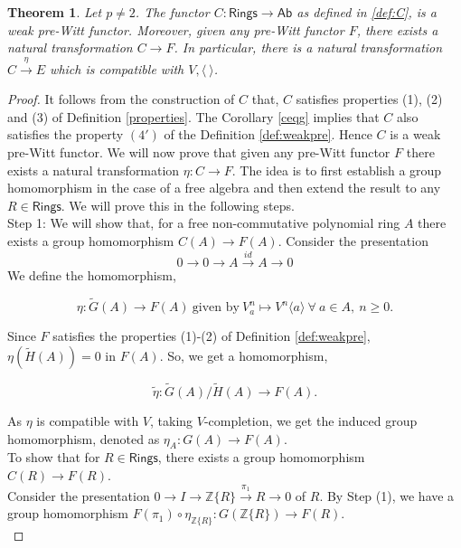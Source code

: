 \documentclass[10pt,a4paper]{amsart}
\newtheorem{theorem}{Theorem}
\newcommand{\Ab}{{\mathsf{Ab}}}
\newcommand{\Rings}{{\mathsf{Rings}}}
\newcommand{\Z}{{\mathbb Z}}
\newcommand{\ab}[1]{\langle {#1} \rangle}
\renewcommand{\tilde}{\widetilde}
\begin{document}
\begin{theorem}\label{universalweakprewitt} Let $p\neq 2$.  The functor $C: \Rings \to \Ab$ as defined in \ref{def:C}, is a weak pre-Witt functor.  Moreover, given any pre-Witt functor $F$, there exists a natural transformation $C \to F$. In particular, there is a natural transformation $C\xrightarrow{\eta} E$ which is compatible with $V, \ab{ \ }$.
\end{theorem}

\begin{proof} It follows from the construction of $C$ that, $C$ satisfies properties (1), (2) and (3) of Definition \ref{properties}. The Corollary \ref{ceqg} implies that $C$ also satisfies the property $(4')$ of the Definition \ref{def:weakpre}. Hence $C$ is a weak pre-Witt functor. We will now prove that given any pre-Witt functor $F$ there exists a natural transformation $\eta: C \to F$. The idea is to first establish a group homomorphism in the case of a free algebra and then extend the result to any $R \in \Rings$. We will prove this in the following steps. \\

\noindent Step 1: We will show that, for a free non-commutative polynomial ring $A$ there exists a group homomorphism $C(A) \to F(A)$. Consider the presentation $$0 \to 0 \to A \xrightarrow{id} A \to 0$$ We define the homomorphism, 

$$\eta : \tilde{G}(A) \to F(A) \ \text{given by} \  V^n_{a}  \mapsto V^n\ab{a} \ \forall \  a \in A, \ n \geq 0.$$ 

\vspace{1mm}
\noindent Since $F$ satisfies the properties (1)-(2) of Definition \ref{def:weakpre}, $\eta(\tilde{H}(A))=0$ in $F(A)$. So, we get a homomorphism,

 $$\tilde{\eta}:\tilde{G}(A)/\tilde{H}(A) \to F(A).$$ 
 
\vspace{1mm}
\noindent As $\eta$ is compatible with $V$, taking $V$-completion, we get the induced group homomorphism, denoted as $\eta_A: G(A) \to F(A)$. \\

 To show that for $R \in \Rings$, there exists a group homomorphism $C(R) \to F(R)$.\\

\noindent Consider the presentation $0 \to I \to \Z\{R\} \stackrel{\pi_1}{\longrightarrow} R \to 0$ of $R$. By Step (1), we have a group homomorphism $F(\pi_1) \circ \eta_{\Z\{R\}} : G(\Z\{R\}) \to F(R)$. \\
\vspace{2mm}


\end{proof}
\end{document}
